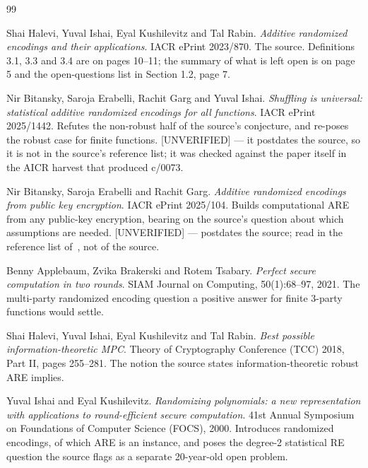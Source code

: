 \documentclass{aicr-conjecture}
\begin{document}
\begin{aicrbibliography}{99}

Shai Halevi, Yuval Ishai, Eyal Kushilevitz and Tal Rabin.
\emph{Additive randomized encodings and their applications}.
IACR ePrint 2023/870.
The source. Definitions 3.1, 3.3 and 3.4 are on pages 10--11; the summary
of what is left open is on page 5 and the open-questions list in
Section 1.2, page 7.

Nir Bitansky, Saroja Erabelli, Rachit Garg and Yuval Ishai.
\emph{Shuffling is universal: statistical additive randomized encodings
for all functions}.
IACR ePrint 2025/1442.
Refutes the non-robust half of the source's conjecture, and re-poses the
robust case for finite functions. [UNVERIFIED] --- it postdates the
source, so it is not in the source's reference list; it was checked
against the paper itself in the AICR harvest that produced c/0073.

Nir Bitansky, Saroja Erabelli and Rachit Garg.
\emph{Additive randomized encodings from public key encryption}.
IACR ePrint 2025/104.
Builds computational ARE from any public-key encryption, bearing on the
source's question about which assumptions are needed. [UNVERIFIED] ---
postdates the source; read in the reference list of~\cite{BEGI25}, not of
the source.

Benny Applebaum, Zvika Brakerski and Rotem Tsabary.
\emph{Perfect secure computation in two rounds}.
SIAM Journal on Computing, 50(1):68--97, 2021.
The multi-party randomized encoding question a positive answer for finite
$3$-party functions would settle.

Shai Halevi, Yuval Ishai, Eyal Kushilevitz and Tal Rabin.
\emph{Best possible information-theoretic MPC}.
Theory of Cryptography Conference (TCC) 2018, Part II, pages 255--281.
The notion the source states information-theoretic robust ARE implies.

Yuval Ishai and Eyal Kushilevitz.
\emph{Randomizing polynomials: a new representation with applications to
round-efficient secure computation}.
41st Annual Symposium on Foundations of Computer Science (FOCS), 2000.
Introduces randomized encodings, of which ARE is an instance, and poses
the degree-2 statistical RE question the source flags as a separate
20-year-old open problem.

\end{aicrbibliography}
\end{document}
